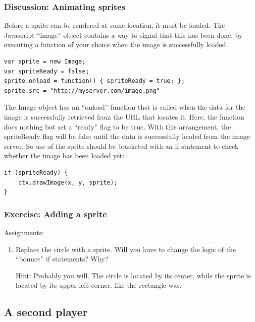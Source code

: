 \documentclass[11pt]{article}
\begin{document}
\subsubsection{Discussion: Animating sprites}

Before a sprite can be rendered at some location, it must be loaded.
The Javascript ``image'' object contains a way to signal that this has
been done, by executing a function of your choice when the image is
successfully loaded.

\begin{verbatim}
var sprite = new Image;
var spriteReady = false;
sprite.onload = function() { spriteReady = true; };
sprite.src = "http://myserver.com/image.png"
\end{verbatim}

The Image object has an ``onload'' function that is called when the
data for the image is successfully retrieved from the URL that locates
it.  Here, the function does nothing but set a ``ready'' flag to be
true.  With this arrangement, the spriteReady flag will be false until
the data is successfully loaded from the image server.  So use of the
sprite should be bracketed with an if statement to check whether the
image has been loaded yet:

\begin{verbatim}
if (spriteReady) {
    ctx.drawImage(x, y, sprite);
}
\end{verbatim}

\subsubsection{Exercise: Adding a sprite}


Assignments:

\begin{enumerate}

\item Replace the circle with a sprite.  Will you have to change the
  logic of the ``bounce'' if statements?  Why?

Hint: Probably you will.  The circle is located by its center, while
the sprite is located by its upper left corner, like the rectangle was.

\end{enumerate}

\subsection{A second player}
\label{second}
\end{document}
